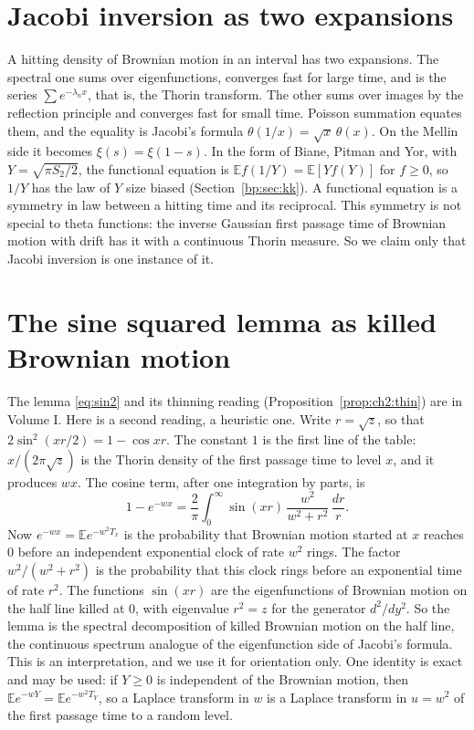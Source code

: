 \section{Jacobi inversion as two expansions}\label{mt:sec:jacobi}
A hitting density of Brownian motion in an interval has two expansions. The spectral one sums over eigenfunctions, converges fast for large time, and is the series $\sum e^{-\lambda_nx}$, that is, the Thorin transform. The other sums over images by the reflection principle and converges fast for small time. Poisson summation equates them, and the equality is Jacobi's formula $\theta(1/x)=\sqrt x\,\theta(x)$. On the Mellin side it becomes $\xi(s)=\xi(1-s)$. In the form of Biane, Pitman and Yor, with $Y=\sqrt{\pi S_2/2}$, the functional equation is $\mathbb Ef(1/Y)=\mathbb E[Yf(Y)]$ for $f\ge0$, so $1/Y$ has the law of $Y$ size biased (Section~\ref{bp:sec:kk}). A functional equation is a symmetry in law between a hitting time and its reciprocal. This symmetry is not special to theta functions: the inverse Gaussian first passage time of Brownian motion with drift has it with a continuous Thorin measure. So we claim only that Jacobi inversion is one instance of it.

\section{The sine squared lemma as killed Brownian motion}\label{mt:sec:sin2}
The lemma \eqref{eq:sin2} and its thinning reading (Proposition~\ref{prop:ch2:thin}) are in Volume I. Here is a second reading, a heuristic one. Write $r=\sqrt z$, so that $2\sin^2(xr/2)=1-\cos xr$. The constant $1$ is the first line of the table: $x/(2\pi\sqrt z)$ is the Thorin density of the first passage time to level $x$, and it produces $wx$. The cosine term, after one integration by parts, is
\[
1-e^{-wx}=\frac2\pi\int_0^\infty\sin(xr)\,\frac{w^2}{w^2+r^2}\,\frac{dr}r .
\]
Now $e^{-wx}=\mathbb Ee^{-w^2T_x}$ is the probability that Brownian motion started at $x$ reaches $0$ before an independent exponential clock of rate $w^2$ rings. The factor $w^2/(w^2+r^2)$ is the probability that this clock rings before an exponential time of rate $r^2$. The functions $\sin(xr)$ are the eigenfunctions of Brownian motion on the half line killed at $0$, with eigenvalue $r^2=z$ for the generator $d^2/dy^2$. So the lemma is the spectral decomposition of killed Brownian motion on the half line, the continuous spectrum analogue of the eigenfunction side of Jacobi's formula. This is an interpretation, and we use it for orientation only. One identity is exact and may be used: if $Y\ge0$ is independent of the Brownian motion, then $\mathbb Ee^{-wY}=\mathbb Ee^{-w^2T_Y}$, so a Laplace transform in $w$ is a Laplace transform in $u=w^2$ of the first passage time to a random level.

